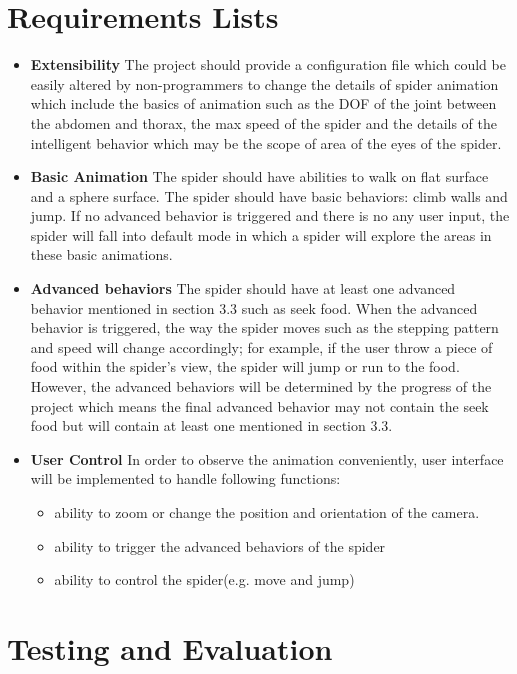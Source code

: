 \section{Requirements Lists}
\begin{itemize}
  \item \textbf{Extensibility}  
The project should provide a configuration file which could be easily altered by non-programmers to change the details of spider animation which include the basics of animation such as the DOF of the joint between the abdomen and thorax, the max speed of the spider and the details of the intelligent behavior which may be the scope of area of the eyes of the spider.
 \item \textbf{Basic Animation} 
  The spider should have abilities to walk on flat surface and a sphere surface. The spider should have basic behaviors: climb walls and jump. If no advanced behavior is triggered and there is no any user input, the spider will fall into default mode in which a spider will explore the areas in these basic animations.
\item \textbf{Advanced behaviors}
  The spider should have at least one advanced behavior mentioned in section 3.3 such as seek food. When the advanced behavior is triggered, the way the spider moves such as the stepping pattern and speed will change accordingly; for example, if the user throw a piece of food within the spider's view, the spider will jump or run to the food. However, the advanced behaviors will be determined by the progress of the project which means the final advanced behavior may not contain the seek food but will contain at least one mentioned in section 3.3.
 \item \textbf{User Control}
 In order to observe the animation conveniently, user interface will be implemented to handle following functions:
 \begin{itemize}
  \item ability to zoom or change the position and orientation of the camera.
  \item ability to trigger the advanced behaviors of the spider
  \item ability to control the spider(e.g. move and jump)
 \end{itemize}
\end{itemize}
\section{Testing and Evaluation}
